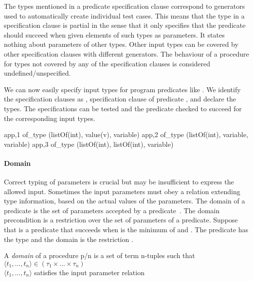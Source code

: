 The types mentioned in a predicate specification clause correspond to \plqc{}
generators used to automatically create individual test cases.
%
This means that the type in a specification clause is partial in the
sense that it only specifies that the predicate should succeed when given
elements of such types as parameters.
%
It states nothing about parameters of other types.
%
Other input types can be covered by other specification clauses with
different generators.
%
The behaviour of a procedure for types not covered by any of the
specification clauses is considered undefined/unspecified.


We can now easily specify input types for program predicates like .
%
We identify the specification clauses as , specification
clause  of predicate , and declare the \plqc{} types.
%
The specifications can be tested and the predicate checked to succeed
for the corresponding input types.
%
\begin{yapcode}
 {app,1} of_type (listOf(int), value(v), variable)
 {app,2} of_type (listOf(int), variable, variable)
 {app,3} of_type (listOf(int), listOf(int), variable)
\end{yapcode}


\paragraph{\bf Domain}

Correct typing of parameters is crucial but may be insufficient to
express the allowed input.
%
Sometimes the input parameters must obey a relation extending type information,
based on the actual values of the parameters.
%
The domain of a predicate is the set of parameters accepted by a
predicate~\cite{Deville1990logprog}.
%
The domain precondition is a restriction over the set of parameters of a
predicate.
%
Suppose that  is a predicate that succeeds when
 is the minimum of  and .
%
The predicate has the type  and the domain is the
restriction .



\begin{definition}
\label{def:domain}
A {\em domain} of a procedure p/n is a set of term
n-tuples such that\\
\qquad $\langle t_1,...,t_n \rangle \in (\tau_1 \times ... \times
\tau_n)$\\
\qquad $\langle t_1,...,t_n \rangle$ satisfies the input parameter relation
\end{definition}


